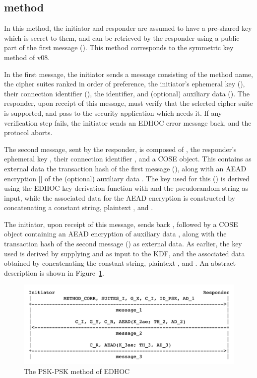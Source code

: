 
\subsection{\mPskPsk method}
In this method, the initiator and responder are assumed to have a pre-shared key which is secret to them, and can be retrieved by the responder using a public part of the first message (\mIDPSK). This method corresponds to the symmetric key method of \mEdhoc v08. 

In the first message, the initiator sends a message consisting of the method name, the cipher suites ranked in order of preference, the initiator's ephemeral key (\mGx), their connection identifier (\mCi), the \mIDPSK identifier, and (optional) auxiliary data (\mADone). The responder, upon receipt of this message, must verify that the selected cipher suite is supported,  and pass \mADone to the security application which needs it. If any verification step fails, the initiator sends an EDHOC error message back, and the protocol aborts.

The second message, sent by the responder, is composed of \mCi, the responder's ephemeral key \mGy, their connection identifier \mCr, and a COSE object. This contains as external data the transaction hash of the first message (\mTHtwo), along with an AEAD encryption [\mcneed] of the (optional) auxiliary data \mADtwo. The key used for this (\mKtwo) is derived using the EDHOC key derivation function with \mTHtwo and the pseudorandom string \mPRKtwo as input, while the associated data for the AEAD encryption is constructed by concatenating a constant string, plaintext \mhplain, and \mTHtwo. 

The initiator, upon receipt of this message, sends back \mCr, followed by a COSE object containing an AEAD encryption of auxiliary data \mADthree, along with the transaction hash of the second message (\mTHthree) as external data. As earlier, the key used is derived by supplying \mTHthree and \mPRKthree as input to the KDF, and the associated data obtained by concatenating the constant string, plaintext \mhplain, and \mTHthree. An abstract description is shown in Figure~\ref{fig:edhocpsk}.


\begin{figure}[!h]\label{fig:edhocpsk}
\centering
\includegraphics[scale=0.3]{Images/psk.png}
\caption{The PSK-PSK method of EDHOC}
\end{figure}

